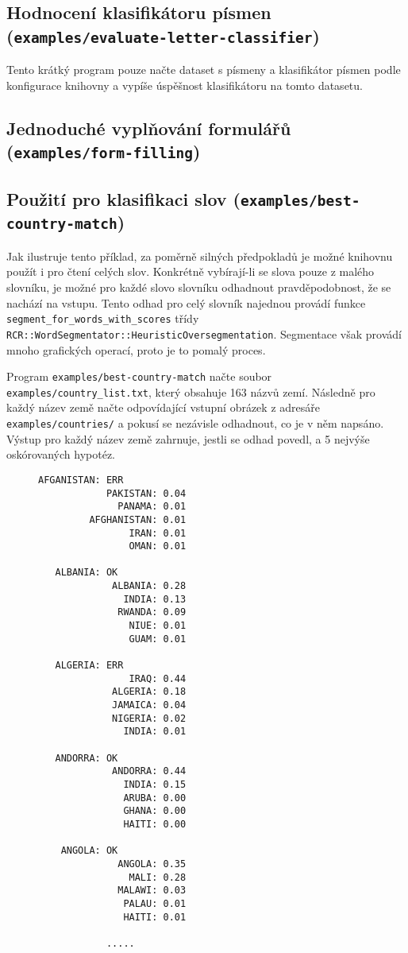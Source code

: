 \documentclass[a4paper]{article}
\begin{document}
\subsection{Hodnocení klasifikátoru písmen (\texttt{examples/evaluate-letter-classifier})}
Tento krátký program pouze načte dataset s písmeny a klasifikátor písmen podle
konfigurace knihovny a vypíše úspěšnost klasifikátoru na tomto datasetu.

\subsection{Jednoduché vyplňování formulářů (\texttt{examples/form-filling})}

\subsection{Použití pro klasifikaci slov (\texttt{examples/best-country-match})}
Jak ilustruje tento příklad, za poměrně silných předpokladů je možné knihovnu
použít i pro čtení celých slov. Konkrétně vybírají-li se slova pouze z
malého slovníku, je možné pro každé slovo slovníku odhadnout pravděpodobnost,
že se nachází na vstupu. Tento odhad pro celý slovník najednou provádí funkce
\texttt{segment\_for\_words\_with\_scores} třídy
\texttt{RCR::WordSegmentator::HeuristicOversegmentation}.
Segmentace však provádí mnoho grafických operací, proto je to pomalý proces.

Program \texttt{examples/best-country-match} načte soubor
\texttt{examples/country\_list.txt}, který obsahuje 163 názvů zemí.
Následně pro každý název země načte odpovídající vstupní obrázek z adresáře
\texttt{examples/countries/} a pokusí se nezávisle odhadnout, co je v něm
napsáno. Výstup pro každý název země zahrnuje, jestli se odhad povedl, a
5 nejvýše oskórovaných hypotéz.

\begin{figure}[!hr]
\begin{lstlisting}
AFGANISTAN: ERR
            PAKISTAN: 0.04
              PANAMA: 0.01
         AFGHANISTAN: 0.01
                IRAN: 0.01
                OMAN: 0.01

   ALBANIA: OK
             ALBANIA: 0.28
               INDIA: 0.13
              RWANDA: 0.09
                NIUE: 0.01
                GUAM: 0.01

   ALGERIA: ERR
                IRAQ: 0.44
             ALGERIA: 0.18
             JAMAICA: 0.04
             NIGERIA: 0.02
               INDIA: 0.01

   ANDORRA: OK
             ANDORRA: 0.44
               INDIA: 0.15
               ARUBA: 0.00
               GHANA: 0.00
               HAITI: 0.00

    ANGOLA: OK
              ANGOLA: 0.35
                MALI: 0.28
              MALAWI: 0.03
               PALAU: 0.01
               HAITI: 0.01

            .....
\end{lstlisting}
\end{figure}
\end{document}
